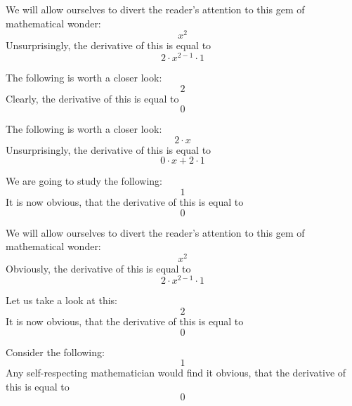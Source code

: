 \documentclass{article}
\begin{document}
We will allow ourselves to divert the reader's attention to this gem of mathematical wonder:
\begin{equation}
x ^{2 } 
\end{equation}
Unsurprisingly, the derivative of this is equal to
\begin{equation}
2 \cdot x ^{2 - 1 } \cdot 1 
\end{equation}

The following is worth a closer look:
\begin{equation}
2 
\end{equation}
Clearly, the derivative of this is equal to
\begin{equation}
0 
\end{equation}

The following is worth a closer look:
\begin{equation}
2 \cdot x 
\end{equation}
Unsurprisingly, the derivative of this is equal to
\begin{equation}
0 \cdot x + 2 \cdot 1 
\end{equation}

We are going to study the following:
\begin{equation}
1 
\end{equation}
It is now obvious, that the derivative of this is equal to
\begin{equation}
0 
\end{equation}

We will allow ourselves to divert the reader's attention to this gem of mathematical wonder:
\begin{equation}
x ^{2 } 
\end{equation}
Obviously, the derivative of this is equal to
\begin{equation}
2 \cdot x ^{2 - 1 } \cdot 1 
\end{equation}

Let us take a look at this:
\begin{equation}
2 
\end{equation}
It is now obvious, that the derivative of this is equal to
\begin{equation}
0 
\end{equation}

Consider the following:
\begin{equation}
1 
\end{equation}
Any self-respecting mathematician would find it obvious, that the derivative of this is equal to
\begin{equation}
0 
\end{equation}
\end{document}
